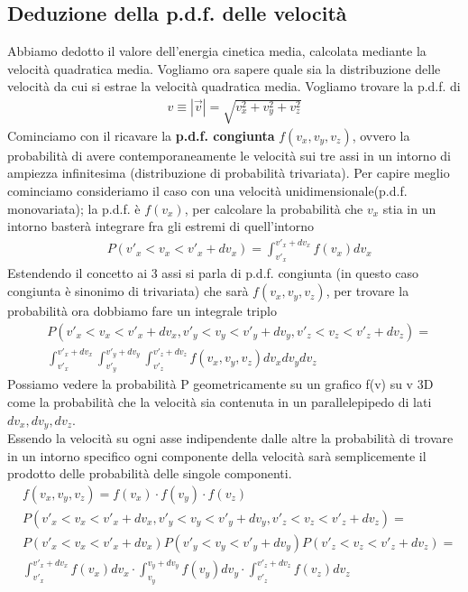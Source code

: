 \documentclass[
10pt, %
a4paper, %
oneside, %
headinclude,footinclude, %
BCOR5mm, %
]{scrartcl}
\begin{document}
\subsection{Deduzione della p.d.f. delle velocità}
Abbiamo dedotto il valore dell'energia cinetica media, calcolata mediante la velocità quadratica media. Vogliamo ora sapere quale sia la distribuzione delle velocità da cui si estrae la velocità quadratica media. Vogliamo trovare la p.d.f. di
\begin{align*} 
	v \equiv |\vec{v}| = \sqrt{v_x^2+v_y^2+v_z^2}
\end{align*} 
Cominciamo con il ricavare la \textbf{p.d.f. congiunta} $f(v_x, v_y, v_z)$, ovvero la probabilità di avere contemporaneamente le velocità sui tre assi in un intorno di ampiezza infinitesima (distribuzione di probabilità trivariata). Per capire meglio cominciamo consideriamo il caso con una velocità unidimensionale(p.d.f. monovariata); la p.d.f. è $f(v_x)$, per calcolare la probabilità che $v_x$ stia in un intorno basterà integrare fra gli estremi di quell'intorno
\begin{align*} 
	& P(v'_x<v_x<v'_x+dv_x)= \int_{v'_x}^{v'_x+dv_x}f(v_x)dv_x
\end{align*} 
Estendendo il concetto ai 3 assi si parla di p.d.f. congiunta (in questo caso congiunta è sinonimo di trivariata) che sarà $f(v_x, v_y, v_z)$, per trovare la probabilità ora dobbiamo fare un integrale triplo
\begin{align*} 
	&P(v'_x<v_x<v'_x+dv_x, v'_y<v_y<v'_y+dv_y, v'_z<v_z<v'_z+dv_z) =\\
	&\int_{v'_x}^{v'_x+dv_x}\int_{v'_y}^{v'_y+dv_y}\int_{v'_z}^{v'_z+dv_z} f(v_x,v_y,v_z) dv_xdv_ydv_z
\end{align*} 
Possiamo vedere la probabilità P geometricamente su un grafico f(v) su v 3D come la probabilità che la velocità sia contenuta in un parallelepipedo di lati $dv_x, dv_y, dv_z$.\\
Essendo la velocità su ogni asse indipendente dalle altre la probabilità di trovare in un intorno specifico ogni componente della velocità sarà semplicemente il prodotto delle probabilità delle singole componenti.
\begin{align}\label{eq:cond1}
	&f(v_x, v_y, v_z) = f(v_x)\cdot f(v_y)\cdot f(v_z)\\
	& P(v'_x<v_x<v'_x+dv_x, v'_y<v_y<v'_y+dv_y, v'_z<v_z<v'_z+dv_z) =\nonumber\\ 
	&P(v'_x<v_x<v'_x+dv_x) P(v'_y<v_y<v'_y+dv_y) P(v'_z<v_z<v'_z+dv_z)=\nonumber\\
	&\int_{v'_x}^{v'_x+dv_x} f(v_x)dv_x \cdot \int_{v_y}^{v_y+dv_y}f(v_y)dv_y \cdot \int_{v'_z}^{v'_z+dv_z}f(v_z)dv_z\nonumber
\end{align} 
\end{document}
